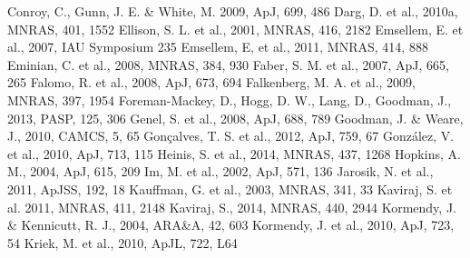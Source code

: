 \documentclass{mn2e}
\begin{document}
\begin{thebibliography}{}
 Conroy, C., Gunn, J. E. \& White, M. 2009, ApJ, 699, 486
 Darg, D. et al., 2010a, MNRAS, 401, 1552
 Ellison, S. L. et al., 2001, MNRAS, 416, 2182
 Emsellem, E. et al., 2007, IAU Symposium 235
 Emsellem, E, et al., 2011, MNRAS, 414, 888
 Eminian, C. et al., 2008, MNRAS, 384, 930
 Faber, S. M. et al., 2007, ApJ, 665, 265
 Falomo, R. et al., 2008, ApJ, 673, 694
 Falkenberg, M. A. et al., 2009, MNRAS, 397, 1954
 Foreman-Mackey, D., Hogg, D. W., Lang, D., Goodman, J., 2013, PASP, 125, 306
 Genel, S. et al., 2008, ApJ, 688, 789
 Goodman, J. \& Weare, J., 2010, CAMCS, 5, 65
 Gon\c calves, T. S. et al., 2012, ApJ, 759, 67
 Gonz\'alez, V. et al., 2010, ApJ, 713, 115
 Heinis, S. et al., 2014, MNRAS, 437, 1268
 Hopkins, A. M., 2004, ApJ, 615, 209
 Im, M. et al., 2002, ApJ, 571, 136
 Jarosik, N. et al., 2011, ApJSS, 192, 18
 Kauffman, G. et al., 2003, MNRAS, 341, 33
 Kaviraj, S. et al. 2011, MNRAS, 411, 2148
 Kaviraj, S., 2014, MNRAS, 440, 2944
 Kormendy, J. \& Kennicutt, R. J., 2004, ARA\&A, 42, 603
 Kormendy, J. et al., 2010, ApJ, 723, 54
 Kriek, M. et al., 2010, ApJL, 722, L64

\end{thebibliography}
\end{document}
